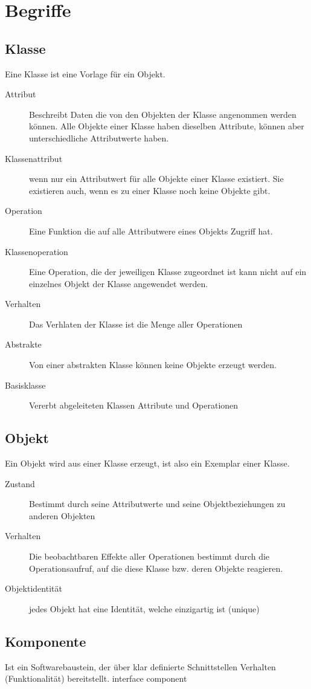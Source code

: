 \section{Begriffe}
\subsection{Klasse}
	Eine Klasse ist eine Vorlage für ein Objekt.
	\begin{description}
	\item[Attribut] Beschreibt Daten die von den Objekten der Klasse angenommen
		werden können. Alle Objekte einer Klasse haben dieselben Attribute, können
		aber unterschiedliche Attributwerte haben.
	\item[Klassenattribut] wenn nur ein Attributwert für alle Objekte einer Klasse
		existiert. Sie existieren auch, wenn es zu einer Klasse noch keine Objekte
		gibt.
	\item[Operation] Eine Funktion die auf alle Attributwere eines Objekts Zugriff
		hat.
	\item[Klassenoperation] Eine Operation, die der jeweiligen Klasse zugeordnet
		ist kann nicht auf ein einzelnes Objekt der Klasse angewendet werden. 
	\item[Verhalten] Das Verhlaten der Klasse ist die Menge aller Operationen
	\item[Abstrakte] Von einer abstrakten Klasse können keine Objekte erzeugt
		werden.
	\item[Basisklasse] Vererbt abgeleiteten Klassen Attribute und Operationen
	\end{description}
	
\subsection{Objekt}
	Ein Objekt wird aus einer Klasse erzeugt, ist also ein Exemplar einer Klasse.
	\begin{description}
		\item[Zustand] Bestimmt durch seine Attributwerte und seine Objektbeziehungen
			zu anderen Objekten
		\item[Verhalten] Die beobachtbaren Effekte aller Operationen bestimmt durch
			die Operationsaufruf, auf die diese Klasse bzw. deren Objekte reagieren.
		\item[Objektidentität] jedes Objekt hat eine Identität, welche einzigartig ist
			(unique)
	\end{description}
	
\subsection{Komponente}
Ist ein Softwarebaustein, der über klar definierte Schnittstellen Verhalten
(Funktionalität) bereitstellt.
interface
component

